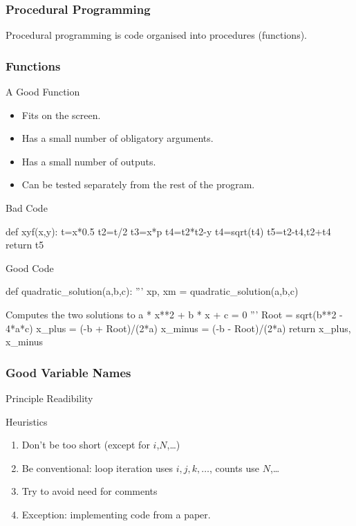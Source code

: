 \begin{frame}[fragile]
\frametitle{Procedural Programming}
Procedural programming is code organised into procedures (functions).
\end{frame}

\begin{frame}[fragile]
\frametitle{Functions}
\begin{block}{A Good Function}
\begin{itemize}
\item Fits on the screen.
\item Has a small number of obligatory arguments.
\item Has a small number of outputs.
\item Can be tested separately from the rest of the program.
\end{itemize}
\end{block}
\end{frame}

\begin{frame}[fragile]
\begin{block}{Bad Code}
\begin{python}
def xyf(x,y):
    t=x*0.5
    t2=t/2
    t3=x*p
    t4=t2*t2-y
    t4=sqrt(t4)
    t5=t2-t4,t2+t4
    return t5

\end{python}
\end{block}

\begin{block}{Good Code}
\begin{python}
def quadratic_solution(a,b,c):
    '''
    xp, xm = quadratic_solution(a,b,c)

    Computes the two solutions to
        a * x**2 + b * x + c = 0
    '''
    Root = sqrt(b**2 - 4*a*c)
    x_plus = (-b + Root)/(2*a)
    x_minus = (-b - Root)/(2*a)
    return x_plus, x_minus

\end{python}

\end{block}
\end{frame}


\begin{frame}[fragile]
\frametitle{Good Variable Names}
\begin{block}{Principle}
Readibility
\end{block}
\begin{block}{Heuristics}
\begin{enumerate}
\item Don't be too short (except for $i$,$N$,\ldots)
\item Be conventional: loop iteration uses $i,j,k,\dots$, counts use $N$,\ldots
\item Try to avoid need for comments
\item Exception: implementing code from a paper.
\end{enumerate}
\end{block}

\end{frame}


